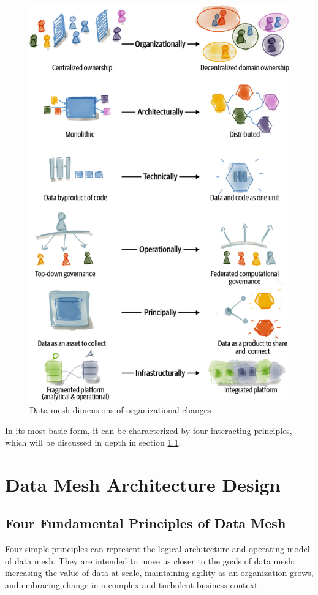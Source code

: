 \documentclass[12pt, a4paper]{book}
\begin{document}
\begin{figure}[h]
	\vspace*{-.3cm}
	\begin{framed}
		\centering
		\includegraphics[width=12cm]{OrgChanges.png}
		\caption{Data mesh dimensions of organizational changes}
		\label{orgchange}
	\end{framed}
\end{figure}

In its most basic form, it can be characterized by four interacting principles, which will be discussed in depth in section \ref{4principles}.

\let\cleardoublepage\clearpage

\chapter{Data Mesh Architecture Design}
\section{Four Fundamental Principles of Data Mesh}\label{4principles}
Four simple principles can represent the logical architecture and operating model of data mesh. They are intended to move us closer to the goals of data mesh: increasing the value of data at scale, maintaining agility as an organization grows, and embracing change in a complex and turbulent business context.
\end{document}
